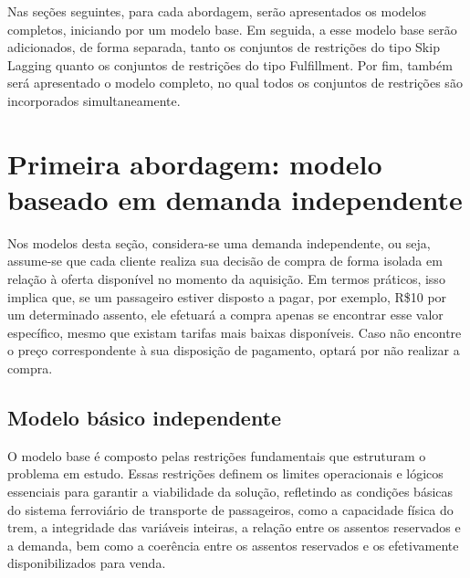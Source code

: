 

Nas seções seguintes, para cada abordagem, serão apresentados os modelos completos, iniciando por um modelo base. Em seguida, a esse modelo base serão adicionados, de forma separada, tanto os conjuntos de restrições do tipo Skip Lagging quanto os conjuntos de restrições do tipo Fulfillment. Por fim, também será apresentado o modelo completo, no qual todos os conjuntos de restrições são incorporados simultaneamente.

\section{Primeira abordagem: modelo baseado em demanda independente}\label{sec:modelo1}

Nos modelos desta seção, considera-se uma demanda independente, ou seja, assume-se que cada cliente realiza sua decisão de compra de forma isolada em relação à oferta disponível no momento da aquisição. Em termos práticos, isso implica que, se um passageiro estiver disposto a pagar, por exemplo, R\$10 por um determinado assento, ele efetuará a compra apenas se encontrar esse valor específico, mesmo que existam tarifas mais baixas disponíveis. Caso não encontre o preço correspondente à sua disposição de pagamento, optará por não realizar a compra.

\subsection{Modelo básico independente}
O modelo base é composto pelas restrições fundamentais que estruturam o problema em estudo. Essas restrições definem os limites operacionais e lógicos essenciais para garantir a viabilidade da solução, refletindo as condições básicas do sistema ferroviário de transporte de passageiros, como a capacidade física do trem, a integridade das variáveis inteiras, a relação entre os assentos reservados e a demanda, bem como a coerência entre os assentos reservados e os efetivamente disponibilizados para venda.

